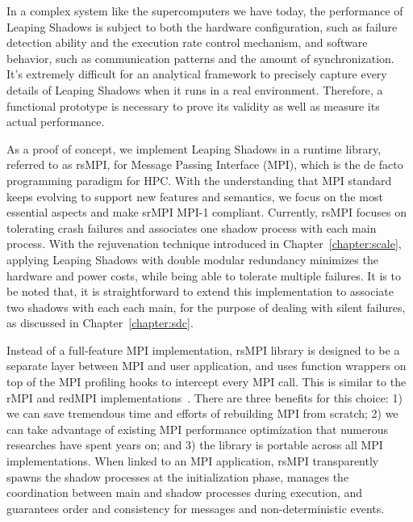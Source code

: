 In a complex system like the supercomputers we have today, the performance of Leaping Shadows is subject to both the hardware configuration, such as failure detection ability and the execution rate control mechanism, and software behavior, such as communication patterns and the amount of synchronization. 
It's extremely difficult for an analytical framework to precisely capture every details of Leaping Shadows when it runs in a real environment. Therefore, a functional prototype is necessary to prove its validity as well as measure its actual performance. 

As a proof of concept, we implement Leaping Shadows in a runtime library, referred to as rsMPI, for Message Passing Interface (MPI), which is the de facto programming paradigm for HPC. With the understanding that MPI standard keeps evolving to support new features and semantics, we focus on the most essential aspects and make srMPI MPI-1 compliant. Currently, rsMPI focuses on tolerating crash failures and associates one shadow process with each main process. %
With the rejuvenation technique introduced in Chapter~\ref{chapter:scale}, applying Leaping Shadows with double modular redundancy minimizes the hardware and power costs, while being able to tolerate multiple failures. It is to be noted that, it is straightforward to extend this implementation to associate two shadows with each each main, for the purpose of dealing with silent failures, as discussed in Chapter~\ref{chapter:sdc}. 


Instead of a full-feature MPI implementation, rsMPI library is designed to be a separate layer between MPI and user application, and uses function wrappers on top of the MPI profiling hooks to intercept every MPI call. This is similar to the rMPI and redMPI implementations~\cite{ferreira_sc_2011,fiala_2012_sdc}. There are three benefits for this choice: 1) we can save tremendous time and efforts of rebuilding MPI from scratch; 2) we can take advantage of existing MPI performance optimization that numerous researches have spent years on; and 3) the library is portable across all MPI implementations. 
When linked to an MPI application, rsMPI transparently spawns the shadow processes at the initialization phase, manages the coordination between main and shadow processes during execution, and guarantees order and consistency for messages and non-deterministic events.

